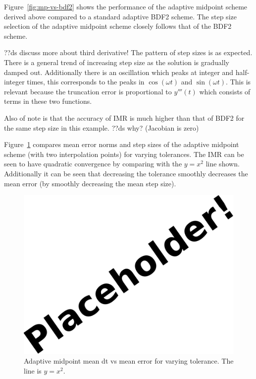 Figure~\ref{fig:mp-vs-bdf2} shows the performance of the adaptive midpoint scheme derived above compared to a standard adaptive BDF2 scheme.\cite{Gresho-Sani} %
The step size selection of the adaptive midpoint scheme closely follows that of the BDF2 scheme.


??ds discuss more about third derivative!
The pattern of step sizes is as expected.
There is a general trend of increasing step size as the solution is gradually damped out.
Additionally there is an oscillation which peaks at integer and half-integer times, this corresponds to the peaks in $\cos(\omega t)$ and $\sin(\omega t)$.
This is relevant because the truncation error is proportional to $y'''(t)$ which consists of terms in these two functions.

Also of note is that the accuracy of IMR is much higher than that of BDF2 for the same step size in this example.
??ds why? (Jacobian is zero)


Figure~\ref{fig:mp-tols} compares mean error norms and step sizes of the adaptive midpoint scheme (with two interpolation points) for varying tolerances.
The IMR can be seen to have quadratic convergence by comparing with the $y=x^2$ line shown.
Additionally it can be seen that decreasing the tolerance smoothly decreases the mean error (by smoothly decreasing the mean step size).

\begin{figure}[ht!]
  \centering
  \includegraphics{images/placeholder}
  \caption{Adaptive midpoint mean dt vs mean error for varying tolerance. The line is $y = x^2$.}
  \label{fig:mp-tols}
\end{figure}


